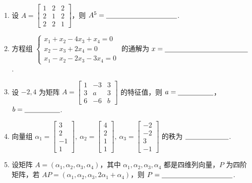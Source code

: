 \documentclass[a4paper,11pt]{ctexart}
\newcommand{\blank}[1][2.8cm]{\underline{\hspace{#1}}}
\begin{document}
\begin{enumerate}[label=\arabic*., leftmargin=2em, itemsep=1.0em, topsep=0.6em]
  \item 设 $A = \begin{bmatrix} 1 & 2 & 2 \\ 2 & 1 & 2 \\ 2 & 2 & 1 \end{bmatrix}$，则 $A^5 = \blank[3.6cm]$.

  \item 方程组 $\begin{cases} x_1 + x_2 - 4x_3 + x_4 = 0 \\ x_2 - x_3 + 2x_4 = 0 \\ x_1 - x_2 - 2x_3 - 3x_4 = 0 \end{cases}$ 的通解为 $x = \blank[4.2cm]$.

  \item 设 $-2, 4$ 为矩阵 $A = \begin{bmatrix} 1 & -3 & 3 \\ 3 & a & 3 \\ 6 & -6 & b \end{bmatrix}$ 的特征值，则 $a = \blank[1.8cm]$，$b = \blank[1.8cm]$.

  \item 向量组 $\alpha_1 = \begin{bmatrix} 3 \\ 2 \\ -1 \\ 1 \end{bmatrix},\ \alpha_2 = \begin{bmatrix} 4 \\ 2 \\ 1 \\ 1 \end{bmatrix},\ \alpha_3 = \begin{bmatrix} -2 \\ -2 \\ 3 \\ -1 \end{bmatrix}$ 的秩为 $\blank[2.2cm]$.

  \item 设矩阵 $A = (\alpha_1, \alpha_2, \alpha_3, \alpha_4)$，其中 $\alpha_1, \alpha_2, \alpha_3, \alpha_4$ 都是四维列向量，$P$ 为四阶矩阵，若 $AP = (\alpha_1, \alpha_2, \alpha_3, 2\alpha_1 + \alpha_4)$，则 $P = \blank[3.6cm]$.
\end{enumerate}

\vspace{1.0em}
\end{document}
